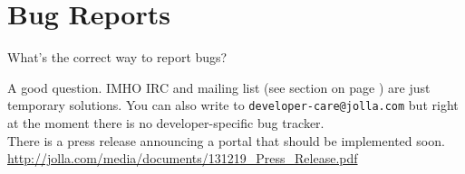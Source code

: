 %
\section{Bug Reports}\label{sec:bugreports}
%
What's the correct way to report bugs?

A good question. IMHO IRC and mailing list (see section  on page \pageref{subsubsec:community:sailfishos}) are just temporary solutions. You can also write to \verb,developer-care@jolla.com, but right at the moment there is no developer-specific bug tracker.
%
\\
There is a press release announcing a portal that should be implemented soon. \url{http://jolla.com/media/documents/131219_Press_Release.pdf}